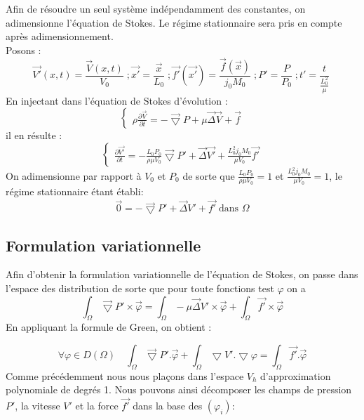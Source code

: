 \documentclass[a4paper,12pt,titlepage]{report}
\begin{document}
\begin{onehalfspace}
\normalsize Afin de résoudre un seul système indépendamment des constantes, on adimensionne l'équation de Stokes. Le régime stationnaire sera pris en compte après adimensionnement.
\\%
Posons :
\begin{equation*}
\vec{V'}(x,t)=\frac{\vec{V}(x,t)}{V_0}\;;\vec{x'}=\frac{\vec{x}}{L_0}\; ; \vec{f'}(\vec{x'})=\frac{\vec{f}(\vec{x})}{j_0M_0}\;;P'=\frac{P}{P_0}\; ;t'=\frac{t}{\frac{L_0^2}{\mu}}\;
\end{equation*}
En injectant dans l'équation de Stokes d'évolution :
\begin{equation*}
  \left\{
    \begin{aligned}
    \rho\frac{\partial \vec{V}}{\partial t}=-\vec{\bigtriangledown} P + \mu \vec{\Delta}\vec{V}+\vec{f}
        \end{aligned}
  \right.
\end{equation*}
il en résulte :
\begin{equation*}
  \left\{
    \begin{aligned}
    \frac{\partial \vec{V'}}{\partial t}=-\frac{L_0 P_0}{\rho \mu V_0}\vec{\bigtriangledown} P '+  \vec{\Delta}\vec{V'}+\frac{L_0^2j_0M_0}{\mu V_0}\vec{f'}
        \end{aligned}
  \right.
\end{equation*}
On adimensionne par rapport à $V_0$ et $P_0$ de sorte que $\frac{L_0 P_0}{\rho \mu V_0}=1$ et $ \frac{L_0^2j _0M_0}{\mu V_0}=1$, le régime stationnaire étant établi:
\[
      \vec{0}=-\vec{\bigtriangledown}P' +\vec{\Delta}V' +\vec{f'}\;\text{dans }\Omega 
\]

\subsection{Formulation variationnelle}

Afin d'obtenir la formulation variationnelle de l'équation de Stokes, on passe dans l'espace des distribution de sorte que pour toute fonctions test $\varphi$ on a 
\[
	\int_\Omega\vec{\bigtriangledown}P'\times \vec \varphi=\int_\Omega-\mu\vec{\Delta}V'\times \vec \varphi +\int_\Omega\vec{f'}\times \vec \varphi 
\]
En appliquant la formule de Green, on obtient :

\[
\forall \varphi \in D(\Omega) \quad  \int_\Omega\vec{\bigtriangledown}P'. \vec \varphi + \int_{\Omega}\bigtriangledown V'. \bigtriangledown \varphi = \int_\Omega\vec{f'}. \vec \varphi
\]
Comme précédemment nous nous plaçons dans l'espace $V_{h}$ d'approximation polynomiale de degrés 1.
Nous pouvons ainsi décomposer les champs de pression $P'$, la vitesse $V'$ et la force $\vec{f'}$ dans la base des $(\varphi_{i})$:


\end{onehalfspace}
\end{document}
